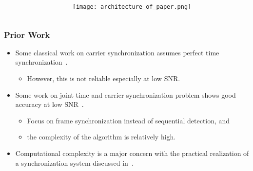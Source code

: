 \begin{frame}
\begin{columns}
\begin{column}{0.54\textwidth}
      \end{column} 

    \begin{column}{0.46\textwidth} 

        \begin{center}
          \texttt{[image: architecture\_of\_paper.png]}
        \end{center}
      
      \end{column}
    \end{columns}

\end{frame}

\begin{frame}
  \frametitle{Prior Work}
  \begin{itemize}
      \item Some classical work on carrier synchronization assumes
        perfect time synchronization~\cite{Morelli_Mengali_98}. 
      \begin{itemize}
        \item  However, this is not reliable especially at low SNR.
      \end{itemize}
      \item Some  work on joint time and carrier synchronization
        problem shows good accuracy at low
        SNR~\cite{purushothaman_16,kim_17}.  
      \begin{itemize}
        \item Focus on frame synchronization instead of sequential detection, and 
        \item the complexity of the algorithm is relatively high.
      \end{itemize}
      \item Computational complexity is a major concern with the
        practical realization of a synchronization system discussed
        in~\cite{murin_16,wang_21}. 
  
  \end{itemize}
\end{frame}
